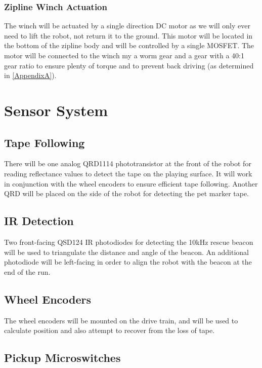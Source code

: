 \documentclass[11pt, oneside]{article} %
\begin{document}
		\subsubsection{Zipline Winch Actuation}
		The winch will be actuated by a single direction DC motor as we will only ever need to lift the robot, not return it to the ground. This motor will be located in the bottom of the zipline body and will be controlled by a single MOSFET. The motor will be connected to the winch my a worm gear and a gear with a 40:1 gear ratio to ensure plenty of torque and to prevent back driving (as determined in \autoref{AppendixA}).


\section{Sensor System}
	
	\subsection{Tape Following}
	
	There will be one analog QRD1114 phototransistor at the front of the robot for reading reflectance values to detect the tape on the playing surface. It will work in conjunction with the wheel encoders to ensure efficient tape following. Another QRD will be placed on the side of the robot for detecting the pet marker tape.
	
	\subsection{IR Detection}
	Two front-facing QSD124 IR photodiodes for detecting the 10kHz rescue beacon will be used to triangulate the distance and angle of the beacon. An additional photodiode will be left-facing in order to align the robot with the beacon at the end of the run.
	
	\subsection{Wheel Encoders}
	
	The wheel encoders will be mounted on the drive train, and will be used to calculate position and also attempt to recover from the loss of tape.
	
	\subsection{Pickup Microswitches}
	
\end{document}
